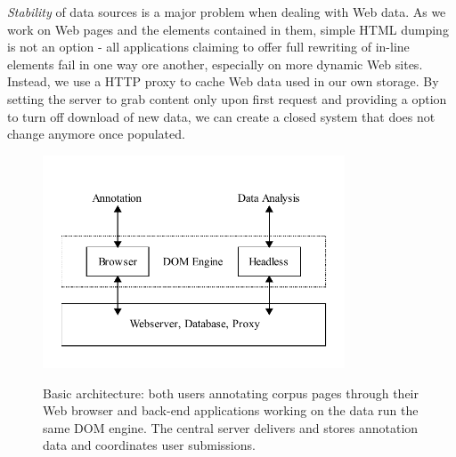 \textit{Stability} of data sources is a major problem when dealing with Web data.
As we work on Web pages and the elements contained in them, simple HTML dumping is not an option - all applications claiming to offer full rewriting of in-line elements fail in one way ore another, especially on more dynamic Web sites.
Instead, we use a HTTP proxy to cache Web data used in our own storage.
By setting the server to grab content only upon first request and providing a option to turn off download of new data, we can create a closed system that does not change anymore once populated.

\begin{figure}
	{\includegraphics[width=0.8\textwidth]{arch}}
\caption{\label{f:arch}Basic {\KrdWrd} architecture: both users annotating corpus pages through their Web browser
and back-end applications working on the data run the same DOM engine.
	The central server delivers and stores annotation data and coordinates user submissions.}
\end{figure}


